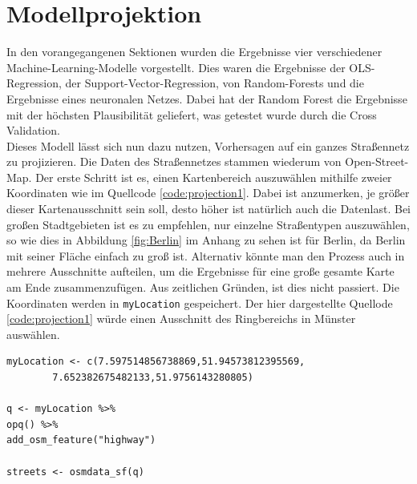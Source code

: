 \documentclass[a4paper,12pt]{thesis}
\begin{document}
\section{Modellprojektion}\label{modellprojection}

In den vorangegangenen Sektionen wurden die Ergebnisse vier verschiedener Machine-Learning-Modelle vorgestellt. Dies waren die Ergebnisse der OLS-Regression, der Support-Vector-Regression, von Random-Forests und die Ergebnisse eines neuronalen Netzes. Dabei hat der Random Forest die Ergebnisse mit der höchsten Plausibilität geliefert, was getestet wurde durch die Cross Validation.\\
Dieses Modell lässt sich nun dazu nutzen, Vorhersagen auf ein ganzes Straßennetz zu projizieren. Die Daten des Straßennetzes stammen wiederum von Open-Street-Map. Der erste Schritt ist es, einen Kartenbereich auszuwählen mithilfe zweier Koordinaten wie im Quellcode \ref{code:projection1}. Dabei ist anzumerken, je größer dieser Kartenausschnitt sein soll, desto höher ist natürlich auch die Datenlast. Bei großen Stadtgebieten ist es zu empfehlen, nur einzelne Straßentypen auszuwählen, so wie dies in Abbildung \ref{fig:Berlin} im Anhang zu sehen ist für Berlin, da Berlin mit seiner Fläche einfach zu groß ist. Alternativ könnte man den Prozess auch in mehrere Ausschnitte aufteilen, um die Ergebnisse für eine große gesamte Karte am Ende zusammenzufügen. Aus zeitlichen Gründen, ist dies nicht passiert. Die Koordinaten werden in \lstinline|myLocation| gespeichert. Der hier dargestellte Quellode \ref{code:projection1} würde einen Ausschnitt des Ringbereichs in Münster auswählen.

\begin{minipage}{\linewidth}
\begin{lstlisting}[caption={Wahl des Kartenausschnitts},label=code:projection1]
myLocation <- c(7.597514856738869,51.94573812395569,   
		7.652382675482133,51.9756143280805)
		
q <- myLocation %>% 
opq() %>%
add_osm_feature("highway")

streets <- osmdata_sf(q)
\end{lstlisting}
\end{minipage}
\end{document}
